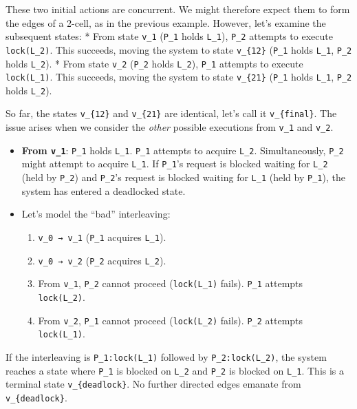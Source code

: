 \documentclass[
]{article}
\providecommand{\tightlist}{%
  \setlength{\itemsep}{0pt}\setlength{\parskip}{0pt}}
\begin{document}
These two initial actions are concurrent. We might therefore expect them
to form the edges of a 2-cell, as in the previous example. However,
let's examine the subsequent states: * From state \texttt{v\_1}
(\texttt{P\_1} holds \texttt{L\_1}), \texttt{P\_2} attempts to execute
\texttt{lock(L\_2)}. This succeeds, moving the system to state
\texttt{v\_\{12\}} (\texttt{P\_1} holds \texttt{L\_1}, \texttt{P\_2}
holds \texttt{L\_2}). * From state \texttt{v\_2} (\texttt{P\_2} holds
\texttt{L\_2}), \texttt{P\_1} attempts to execute \texttt{lock(L\_1)}.
This succeeds, moving the system to state \texttt{v\_\{21\}}
(\texttt{P\_1} holds \texttt{L\_1}, \texttt{P\_2} holds \texttt{L\_2}).

So far, the states \texttt{v\_\{12\}} and \texttt{v\_\{21\}} are
identical, let's call it \texttt{v\_\{final\}}. The issue arises when we
consider the \emph{other} possible executions from \texttt{v\_1} and
\texttt{v\_2}.

\begin{itemize}
\tightlist
\item
  \textbf{From \texttt{v\_1}}: \texttt{P\_1} holds \texttt{L\_1}.
  \texttt{P\_1} attempts to acquire \texttt{L\_2}. Simultaneously,
  \texttt{P\_2} might attempt to acquire \texttt{L\_1}. If
  \texttt{P\_1}'s request is blocked waiting for \texttt{L\_2} (held by
  \texttt{P\_2}) and \texttt{P\_2}'s request is blocked waiting for
  \texttt{L\_1} (held by \texttt{P\_1}), the system has entered a
  deadlocked state.
\item
  Let's model the ``bad'' interleaving:

  \begin{enumerate}
  \def\labelenumi{\arabic{enumi}.}
  \tightlist
  \item
    \texttt{v\_0\ →\ v\_1} (\texttt{P\_1} acquires \texttt{L\_1}).
  \item
    \texttt{v\_0\ →\ v\_2} (\texttt{P\_2} acquires \texttt{L\_2}).
  \item
    From \texttt{v\_1}, \texttt{P\_2} cannot proceed
    (\texttt{lock(L\_1)} fails). \texttt{P\_1} attempts
    \texttt{lock(L\_2)}.
  \item
    From \texttt{v\_2}, \texttt{P\_1} cannot proceed
    (\texttt{lock(L\_2)} fails). \texttt{P\_2} attempts
    \texttt{lock(L\_1)}.
  \end{enumerate}
\end{itemize}

If the interleaving is \texttt{P\_1:lock(L\_1)} followed by
\texttt{P\_2:lock(L\_2)}, the system reaches a state where \texttt{P\_1}
is blocked on \texttt{L\_2} and \texttt{P\_2} is blocked on
\texttt{L\_1}. This is a terminal state \texttt{v\_\{deadlock\}}. No
further directed edges emanate from \texttt{v\_\{deadlock\}}.
\end{document}
